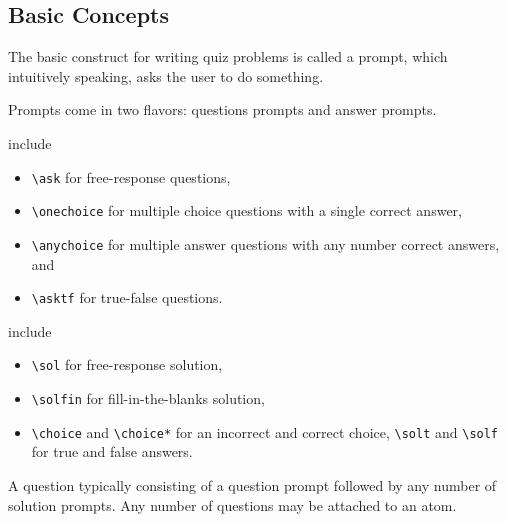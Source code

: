 \subsection{Basic Concepts}
\label{sec:quiz::basic-concepts}

\begin{cluster}
\label{grp:grm:quiz::construct}

\begin{gram}
\label{grm:quiz::construct}
The basic construct for writing quiz problems is called a  prompt, which intuitively speaking, asks the user to do something.

\end{gram}
\end{cluster}

\begin{cluster}
\label{grp:grm:quiz::prompts}

\begin{gram}[Prompts]
\label{grm:quiz::prompts}
Prompts come in two flavors: questions prompts and answer prompts.

  include 
\begin{itemize}
\item \lstinline`\ask` for free-response questions, 
\item \lstinline`\onechoice` for multiple choice questions with a single correct answer, 
\item \lstinline`\anychoice` for multiple answer questions with any number correct answers, and 
\item \lstinline`\asktf` for true-false questions.
\end{itemize}

  include 
\begin{itemize}

\item \lstinline`\sol` for free-response solution, 
\item \lstinline`\solfin` for fill-in-the-blanks solution, 
\item \lstinline`\choice` and \lstinline`\choice*` for an incorrect and correct choice, 
\lstinline`\solt` and \lstinline`\solf`   for true and false answers.
\end{itemize}

A question typically consisting of a question prompt followed by any
number of solution prompts.  
Any number of questions may be attached  to an atom.

\end{gram}
\end{cluster}

